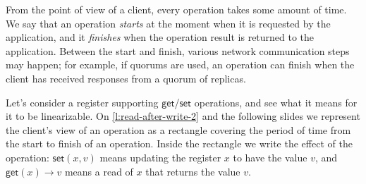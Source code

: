 From the point of view of a client, every operation takes some amount of time.
We say that an operation \emph{starts} at the moment when it is requested by the application, and it \emph{finishes} when the operation result is returned to the application.
Between the start and finish, various network communication steps may happen; for example, if quorums are used, an operation can finish when the client has received responses from a quorum of replicas.

Let's consider a register supporting $\mathsf{get}$/$\mathsf{set}$ operations, and see what it means for it to be linearizable.
On \autoref{l:read-after-write-2} and the following slides we represent the client's view of an operation as a rectangle covering the period of time from the start to finish of an operation.
Inside the rectangle we write the effect of the operation: $\mathsf{set}(x,v)$ means updating the register $x$ to have the value $v$, and $\mathsf{get}(x) \rightarrow v$ means a read of $x$ that returns the value $v$.

